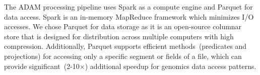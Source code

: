 \documentclass[10pt,twocolumn]{article}
\theoremstyle{plain}
\begin{document}

The ADAM processing pipeline uses Spark as a compute engine and Parquet for data access. Spark is an in-memory MapReduce framework
which minimizes I/O accesses. We chose Parquet for data storage as it is an open-source columnar store that is designed for distribution across
multiple computers with high compression. Additionally, Parquet supports efficient methods~(predicates and projections) for accessing only a
specific segment or fields of a file, which can provide significant~(2-10$\times$) additional speedup for genomics data access patterns.



\end{document}
